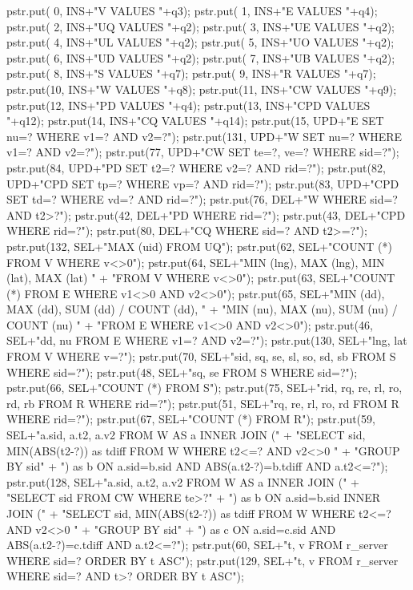 \documentclass{article}
\theoremstyle{definition}
\begin{document}
  pstr.put( 0, INS+"V VALUES "+q3);
  pstr.put( 1, INS+"E VALUES "+q4);
  pstr.put( 2, INS+"UQ VALUES "+q2);
  pstr.put( 3, INS+"UE VALUES "+q2);
  pstr.put( 4, INS+"UL VALUES "+q2);
  pstr.put( 5, INS+"UO VALUES "+q2);
  pstr.put( 6, INS+"UD VALUES "+q2);
  pstr.put( 7, INS+"UB VALUES "+q2);
  pstr.put( 8, INS+"S VALUES "+q7);
  pstr.put( 9, INS+"R VALUES "+q7);
  pstr.put(10, INS+"W VALUES "+q8);
  pstr.put(11, INS+"CW VALUES "+q9);
  pstr.put(12, INS+"PD VALUES "+q4);
  pstr.put(13, INS+"CPD VALUES "+q12);
  pstr.put(14, INS+"CQ VALUES "+q14);
  pstr.put(15, UPD+"E SET nu=? WHERE v1=? AND v2=?");
  pstr.put(131, UPD+"W SET nu=? WHERE v1=? AND v2=?");
  pstr.put(77, UPD+"CW SET te=?, ve=? WHERE sid=?");
  pstr.put(84, UPD+"PD SET t2=? WHERE v2=? AND rid=?");
  pstr.put(82, UPD+"CPD SET tp=? WHERE vp=? AND rid=?");
  pstr.put(83, UPD+"CPD SET td=? WHERE vd=? AND rid=?");
  pstr.put(76, DEL+"W WHERE sid=? AND t2>?");
  pstr.put(42, DEL+"PD WHERE rid=?");
  pstr.put(43, DEL+"CPD WHERE rid=?");
  pstr.put(80, DEL+"CQ WHERE sid=? AND t2>=?");
  pstr.put(132, SEL+"MAX (uid) FROM UQ");
  pstr.put(62, SEL+"COUNT (*) FROM V WHERE v<>0");
  pstr.put(64, SEL+"MIN (lng), MAX (lng), MIN (lat), MAX (lat) "
      + "FROM V WHERE v<>0");
  pstr.put(63, SEL+"COUNT (*) FROM E WHERE v1<>0 AND v2<>0");
  pstr.put(65, SEL+"MIN (dd), MAX (dd), SUM (dd) / COUNT (dd), "
      + "MIN (nu), MAX (nu), SUM (nu) / COUNT (nu) "
      + "FROM E WHERE v1<>0 AND v2<>0");
  pstr.put(46, SEL+"dd, nu FROM E WHERE v1=? AND v2=?");
  pstr.put(130, SEL+"lng, lat FROM V WHERE v=?");
  pstr.put(70, SEL+"sid, sq, se, sl, so, sd, sb FROM S WHERE sid=?");
  pstr.put(48, SEL+"sq, se FROM S WHERE sid=?");
  pstr.put(66, SEL+"COUNT (*) FROM S");
  pstr.put(75, SEL+"rid, rq, re, rl, ro, rd, rb FROM R WHERE rid=?");
  pstr.put(51, SEL+"rq, re, rl, ro, rd FROM R WHERE rid=?");
  pstr.put(67, SEL+"COUNT (*) FROM R");
  pstr.put(59, SEL+"a.sid, a.t2, a.v2 FROM W AS a INNER JOIN ("
      + "SELECT sid, MIN(ABS(t2-?)) as tdiff FROM W WHERE t2<=? AND v2<>0 "
      + "GROUP BY sid"
      + ") as b ON a.sid=b.sid AND ABS(a.t2-?)=b.tdiff AND a.t2<=?");
  pstr.put(128, SEL+"a.sid, a.t2, a.v2 FROM W AS a INNER JOIN ("
      + "SELECT sid FROM CW WHERE te>?"
      + ") as b ON a.sid=b.sid INNER JOIN ("
      + "SELECT sid, MIN(ABS(t2-?)) as tdiff FROM W WHERE t2<=? AND v2<>0 "
      + "GROUP BY sid"
      + ") as c ON a.sid=c.sid AND ABS(a.t2-?)=c.tdiff AND a.t2<=?");
  pstr.put(60, SEL+"t, v FROM r_server WHERE sid=? ORDER BY t ASC");
  pstr.put(129, SEL+"t, v FROM r_server WHERE sid=? AND t>? ORDER BY t ASC");
\end{document}
